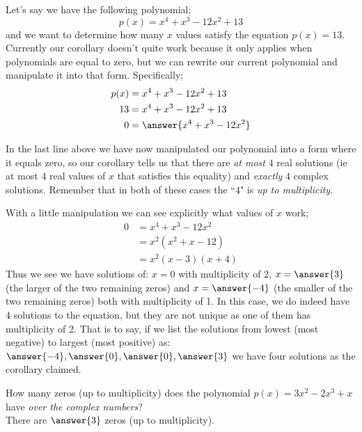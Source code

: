 \documentclass{ximera}
\begin{document}
    \begin{example}%
        Let's say we have the following polynomial;
        \[
            p(x) = x^4 + x^3 - 12 x^2 + 13
        \]
        and we want to determine how many $x$ values satisfy the equation $p(x) = 13$. Currently our corollary doesn't quite work because it only applies when polynomials are equal to zero, but we can rewrite our current polynomial and manipulate it into that form. Specifically;
        \begin{align*}
            p(x) & = x^4 + x^3 - 12 x^2 + 13 \\
            13 & = x^4 + x^3 - 12 x^2 + 13 \\
            0 & = \answer{x^4 + x^3 - 12 x^2}
        \end{align*}
    
        In the last line above we have now manipulated our polynomial into a form where it equals zero, so our corollary tells us that there are \textit{at most} $4$ real solutions (ie at most $4$ real values of $x$ that satisfies this equality) and \textit{exactly} $4$ complex solutions. Remember that in both of these cases the ``$4$" is \textit{up to multiplicity}.
    
        With a little manipulation we can see explicitly what values of $x$ work;
        \begin{align*}
            0 & = x^4 + x^3 - 12 x^2 \\
            & = x^2 ( x^2 + x - 12 ) \\
            & = x^2 ( x - 3 )( x + 4 )
        \end{align*}
        Thus we see we have solutions of: $x = 0$ with multiplicity of 2, $x = \answer{3}$ (the larger of the two remaining zeros) and $x = \answer{-4}$ (the smaller of the two remaining zeros) both with multiplicity of 1. In this case, we do indeed have 4 solutions to the equation, but they are not unique as one of them has multiplicity of 2. That is to say, if we list the solutions from lowest (most negative) to largest (most positive) as: $\answer{-4}, \answer{0}, \answer{0}, \answer{3}$ we have four solutions as the corollary claimed.
    \end{example}%

\begin{question}
    How many zeros (up to multiplicity) does the polynomial $p(x) = 3x^2 - 2x^3 + x$ have \textit{over the complex numbers}?\\
    There are $\answer{3}$ zeros (up to multiplicity).
\end{question}
\end{document}
